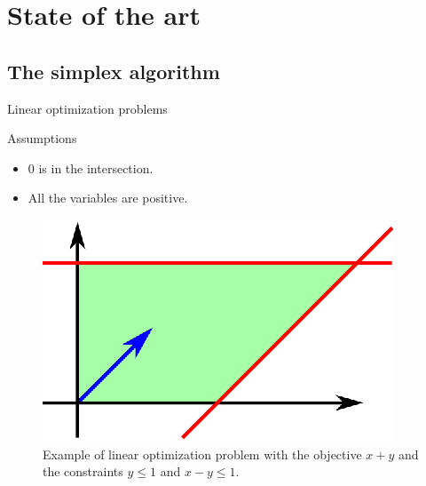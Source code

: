 \section{State of the art}
\subsection{The simplex algorithm}

\begin{frame}{Linear optimization problems}
\begin{block}{Assumptions}
\begin{itemize}
\item $0$ is in the intersection.
\item All the variables are positive.
\end{itemize}
\end{block}
\begin{figure}
\includegraphics[scale=1]{images/simplex1.eps}\\
Example of linear optimization problem with the objective $x+y$ and the constraints $y\leq 1$ and $x-y\leq 1$.
\end{figure}
\end{frame}

